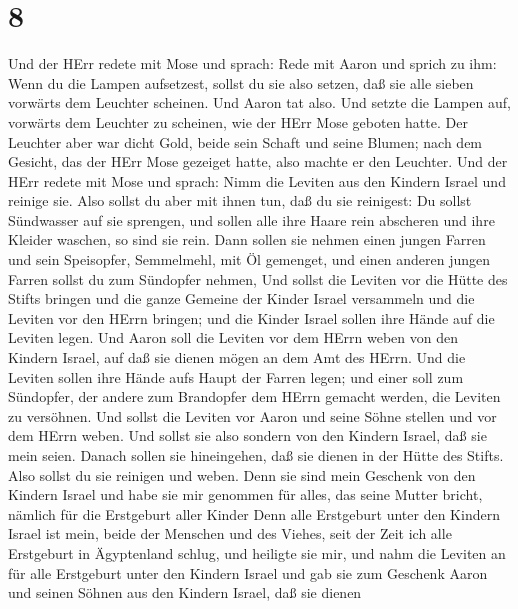 \hypertarget{section-7}{%
\section{8}\label{section-7}}

 Und der HErr redete mit Mose und sprach:  Rede
mit Aaron und sprich zu ihm: Wenn du die Lampen aufsetzest, sollst du
sie also setzen, daß sie alle sieben vorwärts dem Leuchter scheinen.
 Und Aaron tat also. Und setzte die Lampen auf, vorwärts dem
Leuchter zu scheinen, wie der HErr Mose geboten hatte.  Der
Leuchter aber war dicht Gold, beide sein Schaft und seine Blumen; nach
dem Gesicht, das der HErr Mose gezeiget hatte, also machte er den
Leuchter.  Und der HErr redete mit Mose und sprach:
 Nimm die Leviten aus den Kindern Israel und reinige sie.
 Also sollst du aber mit ihnen tun, daß du sie reinigest: Du
sollst Sündwasser auf sie sprengen, und sollen alle ihre Haare rein
abscheren und ihre Kleider waschen, so sind sie rein.  Dann
sollen sie nehmen einen jungen Farren und sein Speisopfer, Semmelmehl,
mit Öl gemenget, und einen anderen jungen Farren sollst du zum Sündopfer
nehmen,  Und sollst die Leviten vor die Hütte des Stifts
bringen und die ganze Gemeine der Kinder Israel versammeln 
und die Leviten vor den HErrn bringen; und die Kinder Israel sollen ihre
Hände auf die Leviten legen.  Und Aaron soll die Leviten
vor dem HErrn weben von den Kindern Israel, auf daß sie dienen mögen an
dem Amt des HErrn.  Und die Leviten sollen ihre Hände aufs
Haupt der Farren legen; und einer soll zum Sündopfer, der andere zum
Brandopfer dem HErrn gemacht werden, die Leviten zu versöhnen.
 Und sollst die Leviten vor Aaron und seine Söhne stellen
und vor dem HErrn weben.  Und sollst sie also sondern von
den Kindern Israel, daß sie mein seien.  Danach sollen sie
hineingehen, daß sie dienen in der Hütte des Stifts. Also sollst du sie
reinigen und weben.  Denn sie sind mein Geschenk von den
Kindern Israel und habe sie mir genommen für alles, das seine Mutter
bricht, nämlich für die Erstgeburt aller Kinder  Denn alle
Erstgeburt unter den Kindern Israel ist mein, beide der Menschen und des
Viehes, seit der Zeit ich alle Erstgeburt in Ägyptenland schlug, und
heiligte sie mir,  und nahm die Leviten an für alle
Erstgeburt unter den Kindern Israel  und gab sie zum
Geschenk Aaron und seinen Söhnen aus den Kindern Israel, daß sie dienen
